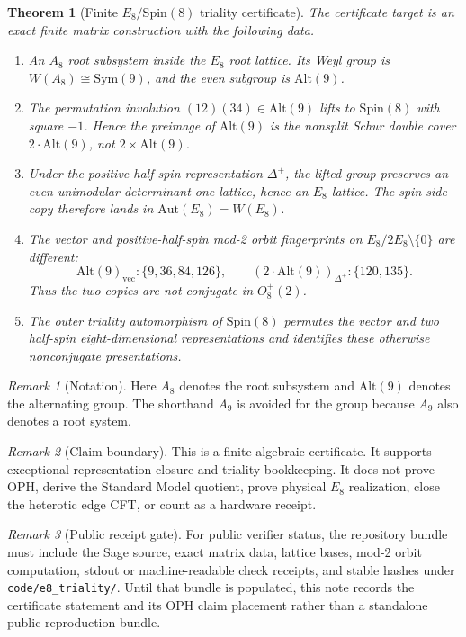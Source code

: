 \documentclass[11pt]{article}
\newtheorem{theorem}{Theorem}
\theoremstyle{remark}
\newtheorem{remark}{Remark}
\theoremstyle{plain}
\begin{document}
\begin{theorem}[Finite \(E_8/\mathrm{Spin}(8)\) triality certificate]
The certificate target is an exact finite matrix construction with the following data.
\begin{enumerate}[leftmargin=2em]
\item An \(A_8\) root subsystem inside the \(E_8\) root lattice. Its Weyl group is
\(W(A_8)\cong\mathrm{Sym}(9)\), and the even subgroup is \(\mathrm{Alt}(9)\).
\item The permutation involution \((12)(34)\in\mathrm{Alt}(9)\) lifts to \(\mathrm{Spin}(8)\) with
square \(-1\). Hence the preimage of \(\mathrm{Alt}(9)\) is the nonsplit Schur double cover
\(2\!\cdot\!\mathrm{Alt}(9)\), not \(2\times\mathrm{Alt}(9)\).
\item Under the positive half-spin representation \(\Delta^+\), the lifted group preserves an even
unimodular determinant-one lattice, hence an \(E_8\) lattice. The spin-side copy therefore lands in
\(\mathrm{Aut}(E_8)=W(E_8)\).
\item The vector and positive-half-spin mod-2 orbit fingerprints on
\(E_8/2E_8\setminus\{0\}\) are different:
\[
\mathrm{Alt}(9)_{\mathrm{vec}}:\{9,36,84,126\},
\qquad
(2\!\cdot\!\mathrm{Alt}(9))_{\Delta^+}:\{120,135\}.
\]
Thus the two copies are not conjugate in \(O_8^+(2)\).
\item The outer triality automorphism of \(\mathrm{Spin}(8)\) permutes the vector and two half-spin
eight-dimensional representations and identifies these otherwise nonconjugate presentations.
\end{enumerate}
\end{theorem}

\begin{remark}[Notation]
Here \(A_8\) denotes the root subsystem and \(\mathrm{Alt}(9)\) denotes the alternating group. The
shorthand \(A_9\) is avoided for the group because \(A_9\) also denotes a root system.
\end{remark}

\begin{remark}[Claim boundary]
This is a finite algebraic certificate. It supports exceptional representation-closure and
triality bookkeeping. It does not prove OPH, derive the Standard Model quotient, prove physical
\(E_8\) realization, close the heterotic edge CFT, or count as a hardware receipt.
\end{remark}

\begin{remark}[Public receipt gate]
For public verifier status, the repository bundle must include the Sage source, exact matrix data,
lattice bases, mod-2 orbit computation, stdout or machine-readable check receipts, and stable
hashes under \texttt{code/e8\_triality/}. Until that bundle is populated, this note records the
certificate statement and its OPH claim placement rather than a standalone public reproduction
bundle.
\end{remark}
\end{document}
